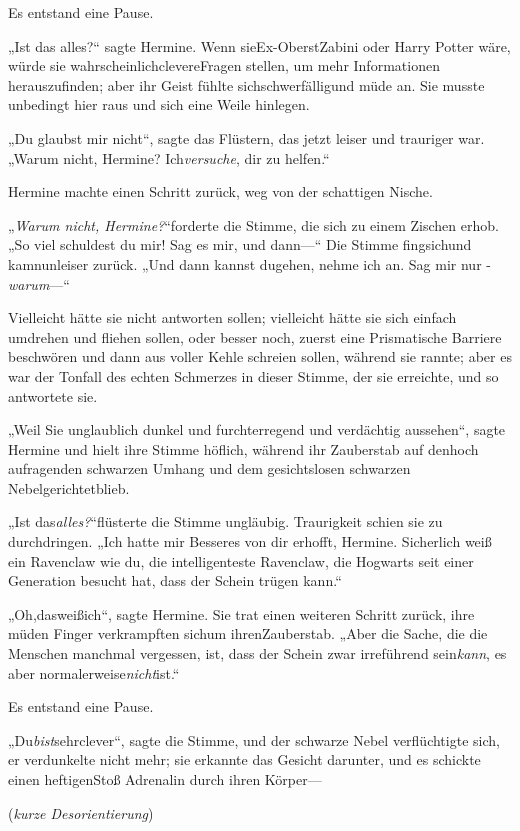 {Es entstand eine Pause.

„Ist das alles?“ sagte Hermine. Wenn sieEx-OberstZabini oder Harry Potter wäre, würde sie wahrscheinlichclevereFragen stellen, um mehr Informationen herauszufinden; aber ihr Geist fühlte sichschwerfälligund müde an. Sie musste unbedingt hier raus und sich eine Weile hinlegen.

„Du glaubst mir nicht“, sagte das Flüstern, das jetzt leiser und trauriger war. „Warum nicht, Hermine? Ich\emph{versuche}, dir zu helfen.“

Hermine machte einen Schritt zurück, weg von der schattigen Nische.

„\emph{Warum nicht, Hermine?}“forderte die Stimme, die sich zu einem Zischen erhob. „So viel schuldest du mir! Sag es mir, und dann—“ Die Stimme fingsichund kamnunleiser zurück. „Und dann kannst dugehen, nehme ich an. Sag mir nur -\emph{warum}—“

Vielleicht hätte sie nicht antworten sollen; vielleicht hätte sie sich einfach umdrehen und fliehen sollen, oder besser noch, zuerst eine Prismatische Barriere beschwören und dann aus voller Kehle schreien sollen, während sie rannte; aber es war der Tonfall des echten Schmerzes in dieser Stimme, der sie erreichte, und so antwortete sie.

„Weil Sie unglaublich dunkel und furchterregend und verdächtig aussehen“, sagte Hermine und hielt ihre Stimme höflich, während ihr Zauberstab auf denhoch aufragenden schwarzen Umhang und dem gesichtslosen schwarzen Nebelgerichtetblieb.

„Ist das\emph{alles?}“flüsterte die Stimme ungläubig. Traurigkeit schien sie zu durchdringen. „Ich hatte mir Besseres von dir erhofft, Hermine. Sicherlich weiß ein Ravenclaw wie du, die intelligenteste Ravenclaw, die Hogwarts seit einer Generation besucht hat, dass der Schein trügen kann.“

„Oh,dasweißich“, sagte Hermine. Sie trat einen weiteren Schritt zurück, ihre müden Finger verkrampften sichum ihrenZauberstab. „Aber die Sache, die die Menschen manchmal vergessen, ist, dass der Schein zwar irreführend sein\emph{kann}, es aber normalerweise\emph{nicht}ist.“

Es entstand eine Pause.

„Du\emph{bist}sehrclever“, sagte die Stimme, und der schwarze Nebel verflüchtigte sich, er verdunkelte nicht mehr; sie erkannte das Gesicht darunter, und es schickte einen heftigenStoß Adrenalin durch ihren Körper—

(\emph{kurze Desorientierung})

}
